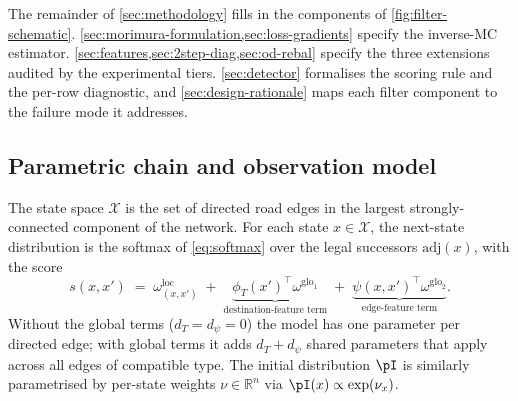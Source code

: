 The remainder of \cref{sec:methodology} fills in the components of
\cref{fig:filter-schematic}. \cref{sec:morimura-formulation,sec:loss-gradients}
specify the inverse-MC estimator. \cref{sec:features,sec:2step-diag,sec:od-rebal}
specify the three extensions audited by the experimental tiers.
\cref{sec:detector} formalises the scoring rule and the per-row
diagnostic, and \cref{sec:design-rationale} maps each filter component to
the failure mode it addresses.

\subsection{Parametric chain and observation model}
\label{sec:morimura-formulation}

The state space $\mathcal{X}$ is the set of directed road edges in the
largest strongly-connected component of the network. For each state
$x \in \mathcal{X}$, the next-state distribution is the softmax of
\cref{eq:softmax} over the legal successors $\mathrm{adj}(x)$, with the
score
\begin{equation}
s(x, x') \;=\; \omega^{\mathrm{loc}}_{(x,x')}
\;+\;
\underbrace{\phi_T(x')^\top \omega^{\mathrm{glo}_1}}_{\text{destination-feature term}}
\;+\;
\underbrace{\psi(x, x')^\top \omega^{\mathrm{glo}_2}}_{\text{edge-feature term}}.
\label{eq:score}
\end{equation}
Without the global terms ($d_T = d_\psi = 0$) the model has one
parameter per directed edge; with global terms it adds $d_T + d_\psi$
shared parameters that apply across all edges of compatible type.
The initial distribution $\pI$ is similarly parametrised by per-state
weights $\nu \in \mathbb{R}^n$ via $\pI(x) \propto \exp(\nu_x)$.

